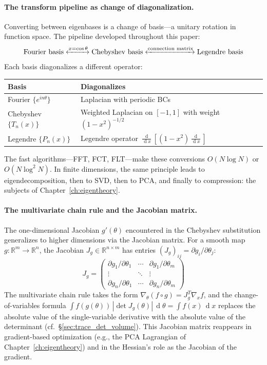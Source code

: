 \documentclass[12pt,a4paper]{report}
\DeclareMathOperator{\deriv}{d}
\theoremstyle{thms}
\theoremstyle{defns}
\begin{document}
\paragraph{The transform pipeline as change of diagonalization.} Converting between eigenbases is a change of basis—a unitary rotation in function space. The pipeline developed throughout this paper:
\begin{equation}
    \text{Fourier basis} \xleftrightarrow{x = \cos\theta} \text{Chebyshev basis} \xleftrightarrow{\text{connection matrix}} \text{Legendre basis}
\end{equation}
Each basis diagonalizes a different operator:
\begin{center}
    \begin{tabular}{l l}
        \hline
        \textbf{Basis} & \textbf{Diagonalizes} \\
        \hline
        Fourier $\{e^{in\theta}\}$ & Laplacian with periodic BCs \\
        Chebyshev $\{T_n(x)\}$ & Weighted Laplacian on $[-1, 1]$ with weight $(1 - x^2)^{-1/2}$ \\
        Legendre $\{P_n(x)\}$ & Legendre operator $\frac{\deriv}{\deriv x}[(1-x^2)\frac{\deriv}{\deriv x}]$ \\
        \hline
    \end{tabular}
\end{center}
The fast algorithms—FFT, FCT, FLT—make these conversions $O(N \log N)$ or $O(N \log^2 N)$. In finite dimensions, the same principle leads to eigendecomposition, then to SVD, then to PCA, and finally to compression: the subjects of Chapter~\ref{ch:eigentheory}.

\paragraph{The multivariate chain rule and the Jacobian matrix.} The one-dimensional Jacobian $g'(\theta)$ encountered in the Chebyshev substitution generalizes to higher dimensions via the Jacobian matrix. For a smooth map $g: \mathbb{R}^m \to \mathbb{R}^n$, the Jacobian $J_g \in \mathbb{R}^{n \times m}$ has entries $(J_g)_{ij} = \partial g_i / \partial \theta_j$:
\begin{equation}
    J_g = \begin{pmatrix} \partial g_1/\partial \theta_1 & \cdots & \partial g_1/\partial \theta_m \\ \vdots & \ddots & \vdots \\ \partial g_n/\partial \theta_1 & \cdots & \partial g_n/\partial \theta_m \end{pmatrix}
\end{equation}
The multivariate chain rule takes the form $\nabla_\theta(f \circ g) = J_g^T \nabla_x f$, and the change-of-variables formula $\int f(g(\theta))\,|\det J_g(\theta)|\,\deriv\theta = \int f(x)\,\deriv x$ replaces the absolute value of the single-variable derivative with the absolute value of the determinant (cf.\ \S\ref{sec:trace_det_volume}). This Jacobian matrix reappears in gradient-based optimization (e.g., the PCA Lagrangian of Chapter~\ref{ch:eigentheory}) and in the Hessian's role as the Jacobian of the gradient.
\end{document}

